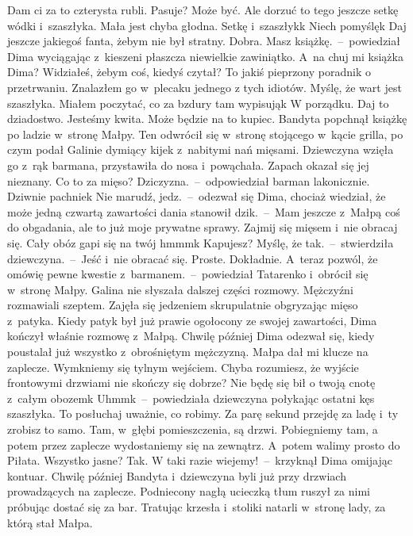 \documentclass[../MAIN.tex]{subfiles}
\begin{document}
\xx  Dam ci za to czterysta rubli. Pasuje?
\xx  Może być. Ale dorzuć to tego jeszcze setkę wódki i~szaszłyka. Mała jest chyba
głodna.
\xx  Setkę i~szaszłyk\3k Niech pomyślę\3k Daj jeszcze jakiegoś fanta, żebym nie
był stratny.
\xx  Dobra. Masz książkę.~--~powiedział Dima wyciągając z~kieszeni płaszcza
niewielkie zawiniątko.
\xx  A~na chuj mi książka Dima? Widziałeś, żebym coś, kiedyś czytał?
\xx  To jakiś pieprzony poradnik o przetrwaniu. Znalazłem go w~plecaku jednego z
tych idiotów. Myślę, że wart jest szaszłyka. Miałem poczytać, co za bzdury tam
wypisują\3k
\xx  W porządku. Daj to dziadostwo. Jesteśmy kwita. Może będzie na to kupiec.
\qm Bandyta popchnął książkę po ladzie w~stronę Małpy. Ten odwrócił się w~stronę
stojącego w~kącie grilla, po czym podał Galinie dymiący kijek z~nabitymi nań
mięsami. Dziewczyna wzięła go z~rąk barmana, przystawiła do nosa i~powąchała.
Zapach okazał się jej nieznany.
\sx
Co to za mięso?
\xx  Dziczyzna.~--~odpowiedział barman lakonicznie.
\xx  Dziwnie pachnie\3k
\xx  Nie marudź, jedz.~--~odezwał się Dima, chociaż wiedział, że może jedną
czwartą zawartości dania stanowił dzik.~--~Mam jeszcze z~Małpą coś do obgadania,
ale to już moje prywatne sprawy. Zajmij się mięsem i~nie obracaj się. Cały obóz
gapi się na twój hmmm\3k Kapujesz?
\xx  Myślę, że tak.~--~stwierdziła dziewczyna.~--~Jeść i~nie obracać się. Proste.
\xx  Dokładnie. A~teraz pozwól, że omówię pewne kwestie z~barmanem.~--~powiedział
Tatarenko i~obrócił się w~stronę Małpy.
\qd
Galina nie słyszała dalszej części
rozmowy. Mężczyźni rozmawiali szeptem. Zajęła się jedzeniem skrupulatnie
obgryzając mięso z~patyka. Kiedy patyk był już prawie ogołocony ze swojej
zawartości, Dima kończył właśnie rozmowę z~Małpą. Chwilę później Dima odezwał
się, kiedy poustalał już wszystko z~obrośniętym mężczyzną.
\sd \xx
Małpa dał mi klucze na zaplecze. Wymkniemy się tylnym wejściem. Chyba
rozumiesz, że wyjście frontowymi drzwiami nie skończy się dobrze? Nie będę się
bił o twoją cnotę z~całym obozem\3k
\xx  Uhmm\3k~--~powiedziała dziewczyna połykając ostatni kęs szaszłyka.
\xx  To posłuchaj uważnie, co robimy. Za parę sekund przejdę za ladę i~ty zrobisz
to samo. Tam, w~głębi pomieszczenia, są drzwi. Pobiegniemy tam, a potem przez
zaplecze wydostaniemy się na zewnątrz. A~potem walimy prosto do Piłata. Wszystko
jasne?
\xx  Tak.
\xx  W taki razie wiejemy!~--~krzyknął Dima omijając kontuar.
\qm
Chwilę później Bandyta i~dziewczyna byli już przy drzwiach prowadzących na
zaplecze. Podniecony nagłą ucieczką tłum ruszył za nimi próbując dostać się za
bar. Tratując krzesła i~stoliki natarli w~stronę lady, za którą stał Małpa.
\end{document}

